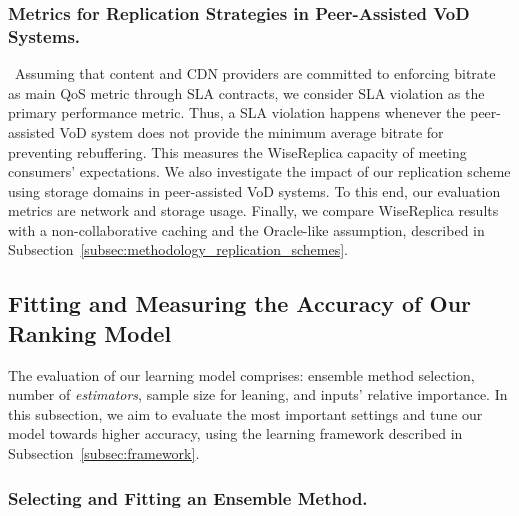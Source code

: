 \subsubsection{Metrics for Replication Strategies in Peer-Assisted VoD Systems.} 

\ Assuming that content and CDN providers are committed to enforcing bitrate as main QoS metric through SLA contracts, we consider SLA violation as the primary performance metric. Thus, a SLA violation happens whenever the peer-assisted VoD system does not provide the minimum average bitrate for preventing rebuffering. This measures the WiseReplica capacity of meeting consumers' expectations. We also investigate the impact of our replication scheme using storage domains in peer-assisted VoD systems. To this end, our evaluation metrics are network and storage usage. Finally, we compare WiseReplica results with a non-collaborative caching and the Oracle-like assumption, described in Subsection~\ref{subsec:methodology_replication_schemes}. 

\subsection{Fitting and Measuring the Accuracy of Our Ranking Model}
\label{subsec:prediction_performance}

The evaluation of our learning model comprises: ensemble method selection, number of \emph{estimators},  sample size for leaning, and inputs' relative importance. In this subsection, we aim to evaluate the most important settings and tune our model towards higher accuracy, using the learning framework described in Subsection~\ref{subsec:framework}.

\subsubsection{Selecting and Fitting an Ensemble Method.}

